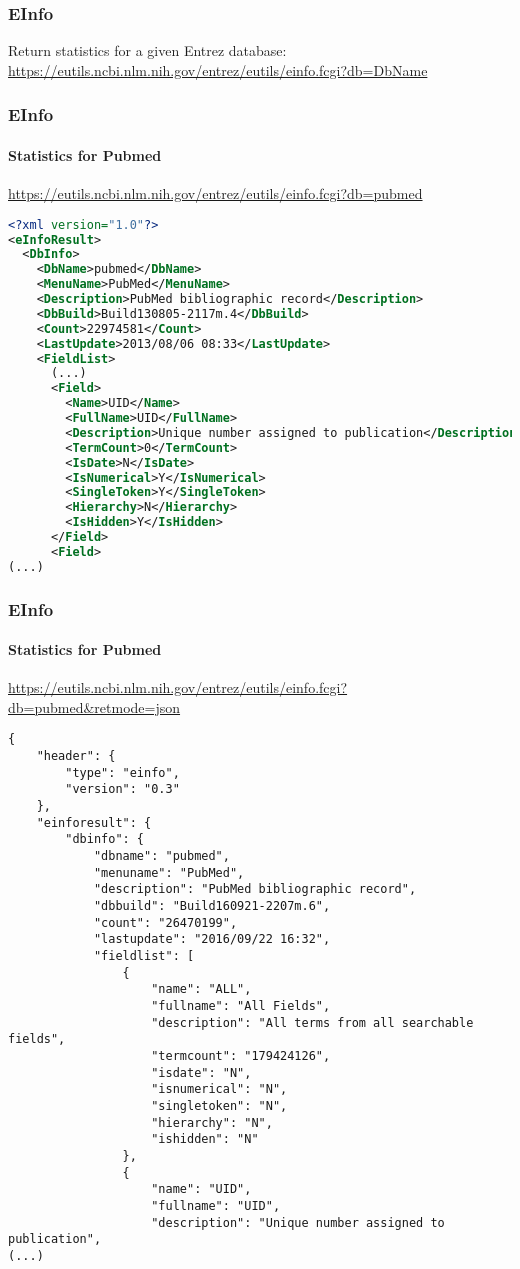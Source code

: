 \documentclass{beamer}
\begin{document}
\begin{frame}[fragile]
\frametitle{EInfo}
Return statistics for a given Entrez database:\\
\small
\url{https://eutils.ncbi.nlm.nih.gov/entrez/eutils/einfo.fcgi?db=DbName}
\end{frame}


\begin{frame}[fragile]
\frametitle{EInfo}
\framesubtitle{Statistics for Pubmed}
\url{https://eutils.ncbi.nlm.nih.gov/entrez/eutils/einfo.fcgi?db=pubmed}
\begin{lstlisting}[language=xml,basicstyle=\tiny,breaklines=false]
<?xml version="1.0"?>
<eInfoResult>
  <DbInfo>
    <DbName>pubmed</DbName>
    <MenuName>PubMed</MenuName>
    <Description>PubMed bibliographic record</Description>
    <DbBuild>Build130805-2117m.4</DbBuild>
    <Count>22974581</Count>
    <LastUpdate>2013/08/06 08:33</LastUpdate>
    <FieldList>
      (...)
      <Field>
        <Name>UID</Name>
        <FullName>UID</FullName>
        <Description>Unique number assigned to publication</Description>
        <TermCount>0</TermCount>
        <IsDate>N</IsDate>
        <IsNumerical>Y</IsNumerical>
        <SingleToken>Y</SingleToken>
        <Hierarchy>N</Hierarchy>
        <IsHidden>Y</IsHidden>
      </Field>
      <Field>
(...)
\end{lstlisting}
\end{frame}

\begin{frame}[fragile]
\frametitle{EInfo}
\framesubtitle{Statistics for Pubmed}
\url{https://eutils.ncbi.nlm.nih.gov/entrez/eutils/einfo.fcgi?db=pubmed&retmode=json}
\begin{lstlisting}[basicstyle=\tiny,breaklines=false]
{
    "header": {
        "type": "einfo",
        "version": "0.3"
    },
    "einforesult": {
        "dbinfo": {
            "dbname": "pubmed",
            "menuname": "PubMed",
            "description": "PubMed bibliographic record",
            "dbbuild": "Build160921-2207m.6",
            "count": "26470199",
            "lastupdate": "2016/09/22 16:32",
            "fieldlist": [
                {
                    "name": "ALL",
                    "fullname": "All Fields",
                    "description": "All terms from all searchable fields",
                    "termcount": "179424126",
                    "isdate": "N",
                    "isnumerical": "N",
                    "singletoken": "N",
                    "hierarchy": "N",
                    "ishidden": "N"
                },
                {
                    "name": "UID",
                    "fullname": "UID",
                    "description": "Unique number assigned to publication",
(...)
\end{lstlisting}
\end{frame}
\end{document}
